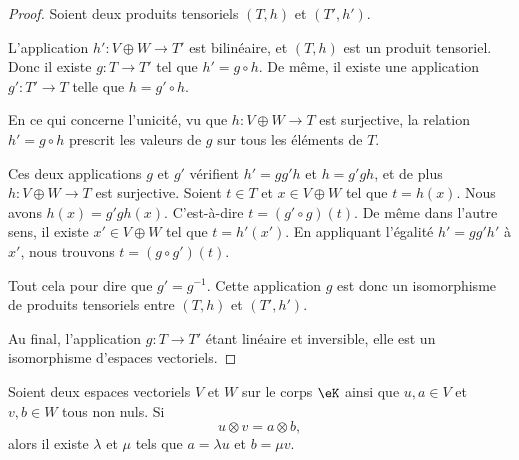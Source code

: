 \begin{proof}
	Soient deux produits tensoriels \( (T,h)\) et \( (T',h')\).

	\begin{subproof}
		\spitem[Existence]

		L'application \( h'\colon V\oplus W\to T'\) est bilinéaire, et \( (T,h)\) est un produit tensoriel. Donc il existe \( g\colon T\to T'\) tel que \( h'=g\circ h\). De même, il existe une application \( g'\colon T'\to T\) telle que \( h=g'\circ h\).

		\spitem[Unicité]

		En ce qui concerne l'unicité, vu que \( h\colon V\oplus W\to T\) est surjective, la relation \( h'=g\circ h\) prescrit les valeurs de \( g\) sur tous les éléments de \( T\).

		\spitem[Inversible]

		Ces deux applications \( g\) et \( g'\) vérifient \( h'=gg'h\) et \( h=g'gh\), et de plus \( h\colon V\oplus W\to T\) est surjective. Soient \( t\in T\) et \( x\in V\oplus W\) tel que \( t=h(x)\). Nous avons \( h(x)=g'gh(x)\). C'est-à-dire \( t=(g'\circ g)(t)\). De même dans l'autre sens, il existe \( x'\in V\oplus W\) tel que \( t=h'(x')\). En appliquant l'égalité \( h'=gg'h'\) à \( x'\), nous trouvons \( t=(g\circ g')(t)\).

		Tout cela pour dire que \( g'=g^{-1}\). Cette application \( g\) est donc un isomorphisme de produits tensoriels entre \( (T,h)\) et \( (T',h')\).
	\end{subproof}
	Au final, l'application \( g\colon T\to T'\) étant linéaire et inversible, elle est un isomorphisme d'espaces vectoriels.
\end{proof}

\begin{proposition}
	Soient deux espaces vectoriels \( V\) et \( W\) sur le corps \( \eK\) ainsi que \( u,a\in V\) et \( v,b\in W\) tous non nuls. Si
	\begin{equation}
		u\otimes v=a\otimes b,
	\end{equation}
	alors il existe \( \lambda\) et \( \mu\) tels que \( a=\lambda u\) et \( b=\mu v\).
\end{proposition}

